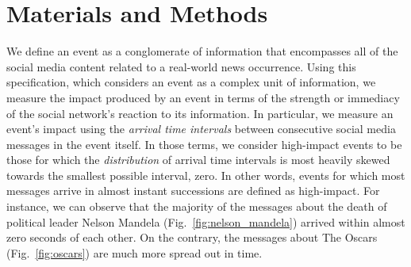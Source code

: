 \section*{Materials and Methods}

We define an event as a conglomerate of information that encompasses
all of the social media content related to a real-world news
occurrence. Using this specification, which considers an event as a
complex unit of information, we measure the impact produced by an
event in terms of the strength or immediacy of the social network's
reaction to its information.  In particular, we measure an event's
impact using the \emph{arrival time intervals} between consecutive
social media messages in the event itself.
In those terms, we consider high-impact events to be those for which
the \emph{distribution} of arrival time intervals is most heavily
skewed towards the smallest possible interval, zero. In other words,
events for which most messages arrive in almost instant successions
are defined as high-impact.
For instance, we can observe that the majority of the messages about
the death of political leader Nelson Mandela
(Fig.~\ref{fig:nelson_mandela}) arrived within almost zero seconds of
each other. On the contrary, the messages about The Oscars
(Fig.~\ref{fig:oscars}) are much more spread out in time.
